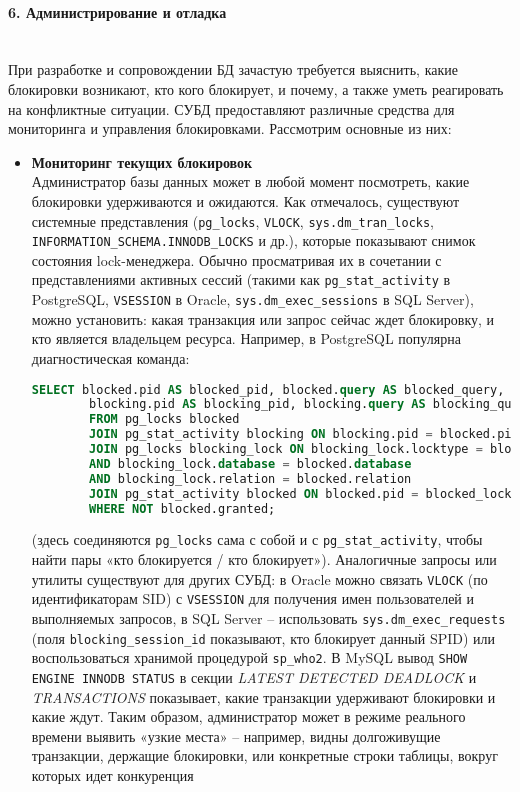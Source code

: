 \paragraph{6. Администрирование и отладка} ~\\
 При разработке и сопровождении БД зачастую требуется выяснить, какие блокировки возникают, кто кого блокирует, и почему, а также уметь реагировать на конфликтные ситуации. СУБД предоставляют различные средства для мониторинга и управления блокировками. Рассмотрим основные из них: 
 \begin{itemize}
    \item \textbf{Мониторинг текущих блокировок} ~\\
    Администратор базы данных может в любой момент посмотреть, какие блокировки удерживаются и ожидаются. Как отмечалось, существуют системные представления (\texttt{pg\_locks}, \texttt{V\textdollar LOCK}, \texttt{sys.dm\_tran\_locks}, \texttt{INFORMATION\_SCHEMA.INNODB\_LOCKS} и др.), которые показывают снимок состояния lock-менеджера. Обычно просматривая их в сочетании с представлениями активных сессий (такими как \texttt{pg\_stat\_activity} в PostgreSQL, \texttt{V\textdollar SESSION} в Oracle, \texttt{sys.dm\_exec\_sessions} в SQL Server), можно установить: какая транзакция или запрос сейчас ждет блокировку, и кто является владельцем ресурса. Например, в PostgreSQL популярна диагностическая команда:
    \begin{lstlisting}[language=SQL]
        SELECT blocked.pid AS blocked_pid, blocked.query AS blocked_query,
        blocking.pid AS blocking_pid, blocking.query AS blocking_query
        FROM pg_locks blocked
        JOIN pg_stat_activity blocking ON blocking.pid = blocked.pid
        JOIN pg_locks blocking_lock ON blocking_lock.locktype = blocked.locktype
        AND blocking_lock.database = blocked.database
        AND blocking_lock.relation = blocked.relation
        JOIN pg_stat_activity blocked ON blocked.pid = blocked_lock.pid
        WHERE NOT blocked.granted;
    \end{lstlisting}
    (здесь соединяются \texttt{pg\_locks} сама с собой и с \texttt{pg\_stat\_activity}, чтобы найти пары «кто блокируется / кто блокирует»). Аналогичные запросы или утилиты существуют для других СУБД: в Oracle можно связать \texttt{V\textdollar LOCK} (по идентификаторам SID) с \texttt{V\textdollar SESSION} для получения имен пользователей и выполняемых запросов, в SQL Server – использовать \texttt{sys.dm\_exec\_requests} (поля \texttt{blocking\_session\_id} показывают, кто блокирует данный SPID) или воспользоваться хранимой процедурой \texttt{sp\_who2}. В MySQL вывод \texttt{SHOW ENGINE INNODB STATUS} в секции \textit{LATEST DETECTED DEADLOCK} и \textit{TRANSACTIONS} показывает, какие транзакции удерживают блокировки и какие ждут. Таким образом, администратор может в режиме реального времени выявить «узкие места» – например, видны долгоживущие транзакции, держащие блокировки, или конкретные строки таблицы, вокруг которых идет конкуренция
    

\end{itemize}
